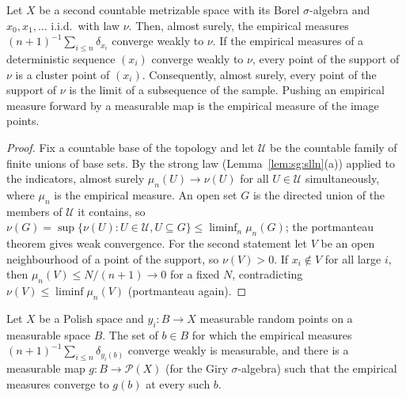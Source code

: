 \begin{lemma}\label{lem:sg:empirical}
  \leanok
Let $X$ be a second countable metrizable space with its Borel $\sigma$-algebra and $x_0,x_1,\dots$ i.i.d.\ with law $\nu$. Then, almost surely, the empirical measures $(n+1)^{-1}\sum_{i\le n}\delta_{x_i}$ converge weakly to $\nu$. If the empirical measures of a deterministic sequence $(x_i)$ converge weakly to $\nu$, every point of the support of $\nu$ is a cluster point of $(x_i)$. Consequently, almost surely, every point of the support of $\nu$ is the limit of a subsequence of the sample.
Pushing an empirical measure forward by a measurable map is the empirical measure of the image points.
\end{lemma}

\begin{proof}
  \leanok
{}
Fix a countable base of the topology and let $\mathcal U$ be the countable family of finite unions of base sets. By the strong law (Lemma~\ref{lem:sg:slln}(a)) applied to the indicators, almost surely $\mu_n(U)\to\nu(U)$ for all $U\in\mathcal U$ simultaneously, where $\mu_n$ is the empirical measure. An open set $G$ is the directed union of the members of $\mathcal U$ it contains, so $\nu(G)=\sup\{\nu(U):U\in\mathcal U,U\subseteq G\}\le\liminf_n\mu_n(G)$; the portmanteau theorem gives weak convergence. For the second statement let $V$ be an open neighbourhood of a point of the support, so $\nu(V)>0$. If $x_i\notin V$ for all large $i$, then $\mu_n(V)\le N/(n+1)\to0$ for a fixed $N$, contradicting $\nu(V)\le\liminf\mu_n(V)$ (portmanteau again).
\end{proof}

\begin{lemma}\label{lem:sg:measurable-limit}
  \leanok
Let $X$ be a Polish space and $y_i:B\to X$ measurable random points on a measurable space $B$. The set of $b\in B$ for which the empirical measures $(n+1)^{-1}\sum_{i\le n}\delta_{y_i(b)}$ converge weakly is measurable, and there is a measurable map $g:B\to\mathcal P(X)$ (for the Giry $\sigma$-algebra) such that the empirical measures converge to $g(b)$ at every such $b$.
\end{lemma}

